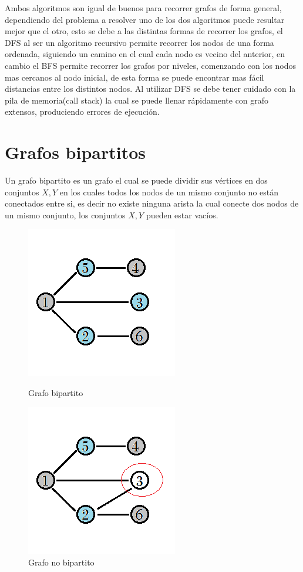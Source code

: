 \documentclass[12pt, a4paper]{article}
\begin{document}
	Ambos algoritmos son igual de buenos para recorrer grafos de forma general, dependiendo del problema a resolver
	uno de los dos algoritmos puede resultar mejor que el otro, esto se debe a las distintas formas de recorrer
	los grafos, el DFS al ser un algoritmo recursivo permite recorrer los nodos de una forma ordenada, siguiendo un
	camino en el cual cada nodo es vecino del anterior, en cambio el BFS permite recorrer los grafos por niveles, 
	comenzando con los nodos mas cercanos al nodo inicial, de esta forma se puede encontrar mas fácil distancias entre
	los distintos nodos. Al utilizar DFS se debe tener cuidado con la pila de memoria(call stack) la cual se puede
	llenar rápidamente con grafo extensos, produciendo errores de ejecución.
	
	\section{Grafos bipartitos}
	
	Un grafo bipartito es un grafo el cual se puede dividir sus vértices en dos conjuntos ${X, Y}$ en los cuales
	todos los nodos de un mismo conjunto no están conectados entre si, es decir no existe ninguna arista la cual
	conecte dos nodos de un mismo conjunto, los conjuntos ${X, Y}$ pueden estar vacíos.
	
	\begin{figure}[!htb]
			\centering
			\includegraphics[scale=1]{Grafos/imagenes/BipartitoSi}
			\caption{Grafo bipartito}%
		\endminipage
			\centering
			\includegraphics[scale=1]{Grafos/imagenes/BipartitoNo}
			\caption{Grafo no bipartito}%
		\endminipage
	\end{figure}	
	
\end{document}
